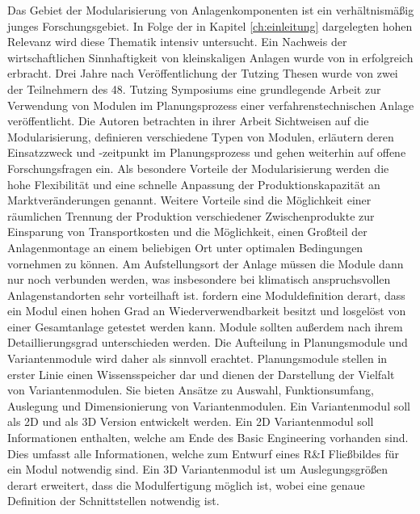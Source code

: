 Das Gebiet der Modularisierung von Anlagenkomponenten ist ein verh\"altnism\"a\ss{}ig junges Forschungsgebiet. In Folge der in Kapitel \ref{ch:einleitung} dargelegten hohen Relevanz wird diese Thematik intensiv untersucht. \newline
Ein Nachweis der wirtschaftlichen Sinnhaftigkeit von kleinskaligen Anlagen wurde von \citeauthor{Seifert_2012} in  erfolgreich erbracht. \cite{Seifert_2012} \newline
Drei Jahre nach Ver\"offentlichung der Tutzing Thesen \cite{Processnet_2009} wurde von zwei der Teilnehmern des 48. Tutzing Symposiums eine grundlegende Arbeit zur Verwendung von Modulen im Planungsprozess einer verfahrenstechnischen Anlage ver\"offentlicht. Die Autoren \citeauthor{Bramsiepe_2012} betrachten in ihrer Arbeit  \cite{Bramsiepe_2012} Sichtweisen auf die Modularisierung, definieren verschiedene Typen von Modulen, erl\"autern deren Einsatzzweck und -zeitpunkt im Planungsprozess und gehen weiterhin auf offene Forschungsfragen ein. \newline
Als besondere Vorteile der Modularisierung werden die hohe Flexibilit\"at und eine schnelle Anpassung der Produktionskapazit\"at an Marktver\"anderungen genannt. Weitere Vorteile sind die M\"oglichkeit einer r\"aumlichen Trennung der Produktion verschiedener  Zwischenprodukte zur Einsparung von Transportkosten und die M\"oglichkeit, einen Gro\ss{}teil der Anlagenmontage an einem beliebigen Ort unter optimalen Bedingungen vornehmen zu k\"onnen. Am Aufstellungsort der Anlage m\"ussen die Module dann nur noch verbunden werden, was insbesondere bei klimatisch anspruchsvollen Anlagenstandorten sehr vorteilhaft ist. \newline
\citeauthor{Bramsiepe_2012} fordern eine Moduldefinition derart, dass ein Modul einen hohen Grad an Wiederverwendbarkeit besitzt und losgel\"ost von einer Gesamtanlage getestet werden kann. Module sollten au\ss{}erdem nach ihrem Detaillierungsgrad unterschieden werden. Die Aufteilung in Planungsmodule und Variantenmodule wird daher als sinnvoll erachtet. Planungsmodule stellen in erster Linie einen Wissensspeicher dar und dienen der Darstellung der Vielfalt von Variantenmodulen. Sie bieten Ans\"atze zu Auswahl, Funktionsumfang, Auslegung und Dimensionierung von Variantenmodulen. Ein Variantenmodul soll als 2D und als 3D Version entwickelt werden. Ein 2D Variantenmodul soll Informationen enthalten, welche am Ende des Basic Engineering vorhanden sind. Dies umfasst alle Informationen, welche zum Entwurf eines R\&{}I Flie\ss{}bildes f\"ur ein Modul notwendig sind. Ein 3D Variantenmodul ist um Auslegungsgr\"o\ss{}en derart erweitert, dass die Modulfertigung m\"oglich ist, wobei eine genaue Definition der Schnittstellen notwendig ist. \newline
